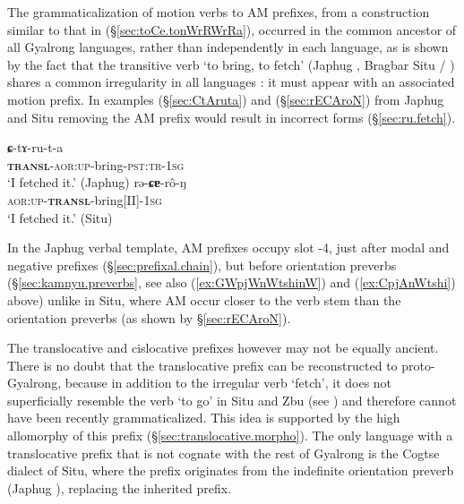 The grammaticalization of motion verbs to AM prefixes, from a construction similar to that in (§\ref{sec:toCe.tonWrRWrRa}), occurred in the common ancestor of all Gyalrong languages, rather than independently in each language, as is shown by the fact that the transitive verb `to bring, to fetch' (Japhug , Bragbar Situ  / ) shares a common irregularity in all languages \citep{jacques13harmonization}: it must appear with an associated motion prefix. In examples (§\ref{sec:CtAruta}) and (§\ref{sec:rECAroN}) from Japhug and Situ removing the AM prefix would result in incorrect forms (§\ref{sec:ru.fetch}).

\begin{exe}
 \ex  \label{sec:CtAruta}
 \gll  \textbf{ɕ}-tɤ-ru-t-a  \\
 \textbf{\textsc{transl}}-\textsc{aor}:\textsc{up}-bring-\textsc{pst}:\textsc{tr}-1\textsc{sg} \\
 \glt `I fetched it.' (Japhug)
 \ex  \label{sec:rECAroN}
 \gll   rə-\textbf{ɕɐ}-rô-ŋ  \\
\textsc{aor}:\textsc{up}-\textbf{\textsc{transl}}-bring[II]-1\textsc{sg} \\
\glt `I fetched it.' (Situ)
\end{exe}

In the Japhug verbal template, AM prefixes occupy slot -4, just after modal and negative prefixes (§\ref{sec:prefixal.chain}), but before orientation preverbs (§\ref{sec:kamnyu.preverbs}, see also (\ref{ex:GWpjWnWtshinW}) and (\ref{ex:CpjAnWtshi}) above) unlike in Situ, where AM occur closer to the verb stem than the orientation preverbs (as shown by §\ref{sec:rECAroN}).

The translocative and cislocative prefixes however may not be equally ancient. There is no doubt that the translocative prefix can be reconstructed to proto-Gyalrong, because in addition to the irregular verb `fetch', it does not superficially resemble the verb `to go' in Situ and Zbu (see ) and therefore cannot have been recently grammaticalized. This idea is supported by the high allomorphy of this prefix (§\ref{sec:translocative.morpho}). The only language with a translocative prefix that is not cognate with the rest of Gyalrong is the Cogtse dialect of Situ, where the prefix  originates from the indefinite orientation preverb (Japhug ), replacing the inherited prefix.

